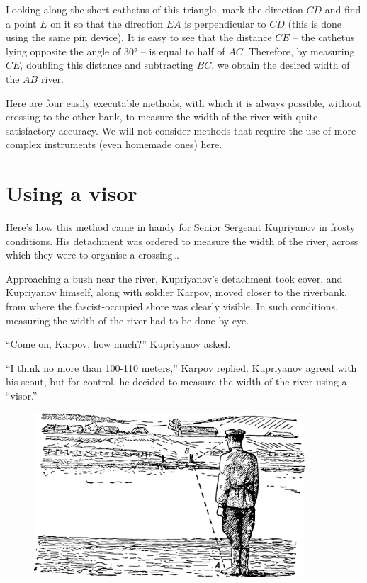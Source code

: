\begin{enumerate}
\begin{marginfigure}
\end{marginfigure}
Looking along the short cathetus of this triangle, mark the direction $CD$ and find a point $E$ on it so that the direction $EA$ is perpendicular to $CD$ (this is done using the same pin device). It is easy to see that the distance $CE$ -- the cathetus lying opposite the angle of \ang{30} -- is equal to half of $AC$. Therefore, by measuring $CE$, doubling this distance and subtracting $BC$, we obtain the desired width of the $AB$ river.

\end{enumerate}

Here are four easily executable methods, with which it is always possible, without crossing to the other bank, to measure the width of the river with quite satisfactory accuracy. We will not consider methods that require the use of more complex instruments (even homemade ones) here.

\section{Using a visor}
\label{sec-2.2}

Here's how this method came in handy for Senior Sergeant Kupriyanov in frosty conditions. His detachment was ordered to measure the width of the river, across which they were to organise a crossing\ldots{}

Approaching a bush near the river, Kupriyanov's detachment took cover, and Kupriyanov himself, along with soldier Karpov, moved closer to the riverbank, from where the fascist-occupied shore was clearly visible. In such conditions, measuring the width of the river had to be done by eye.

``Come on, Karpov, how much?'' Kupriyanov asked.

``I think no more than 100-110 meters,'' Karpov replied. Kupriyanov agreed with his scout, but for control, he decided to measure the width of the river using a ``visor.''

\begin{figure}[h!]
\centering
\includegraphics[width=0.9\textwidth]{figures/ch-02/fig-032.pdf}
\end{figure}

